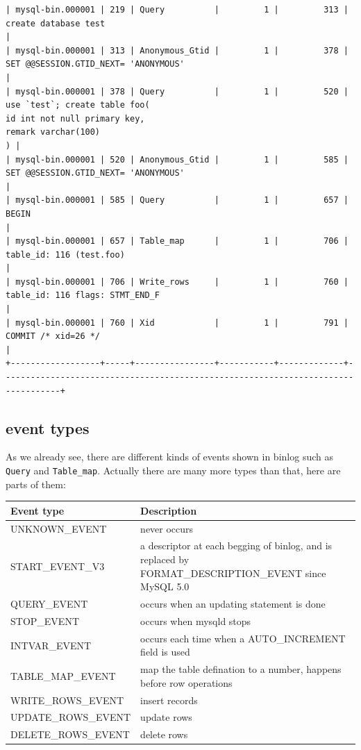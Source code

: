 \documentclass[12pt]{article}
\begin{document}
\begin{verbatim}
| mysql-bin.000001 | 219 | Query          |         1 |         313 | create database test                                                             |
| mysql-bin.000001 | 313 | Anonymous_Gtid |         1 |         378 | SET @@SESSION.GTID_NEXT= 'ANONYMOUS'                                             |
| mysql-bin.000001 | 378 | Query          |         1 |         520 | use `test`; create table foo(
id int not null primary key,
remark varchar(100)
) |
| mysql-bin.000001 | 520 | Anonymous_Gtid |         1 |         585 | SET @@SESSION.GTID_NEXT= 'ANONYMOUS'                                             |
| mysql-bin.000001 | 585 | Query          |         1 |         657 | BEGIN                                                                            |
| mysql-bin.000001 | 657 | Table_map      |         1 |         706 | table_id: 116 (test.foo)                                                         |
| mysql-bin.000001 | 706 | Write_rows     |         1 |         760 | table_id: 116 flags: STMT_END_F                                                  |
| mysql-bin.000001 | 760 | Xid            |         1 |         791 | COMMIT /* xid=26 */                                                              |
+------------------+-----+----------------+-----------+-------------+----------------------------------------------------------------------------------+
\end{verbatim}

\subsection{event types}\label{event-types}

As we already see, there are different kinds of events shown in binlog such as \texttt{Query} and \texttt{Table\_map}. Actually there are many more types than that, here are parts of them:

{\def\LTcaptype{none} %
\begin{longtable}[]{@{}ll@{}}
\toprule\noalign{}
Event type & Description \\
\midrule\noalign{}
\endhead
\bottomrule\noalign{}
\endlastfoot
UNKNOWN\_EVENT & never occurs \\
START\_EVENT\_V3 & a descriptor at each begging of binlog, and is replaced by FORMAT\_DESCRIPTION\_EVENT since MySQL 5.0 \\
QUERY\_EVENT & occurs when an updating statement is done \\
STOP\_EVENT & occurs when mysqld stops \\
INTVAR\_EVENT & occurs each time when a AUTO\_INCREMENT field is used \\
TABLE\_MAP\_EVENT & map the table defination to a number, happens before row operations \\
WRITE\_ROWS\_EVENT & insert records \\
UPDATE\_ROWS\_EVENT & update rows \\
DELETE\_ROWS\_EVENT & delete rows \\
\end{longtable}
}
\end{document}
